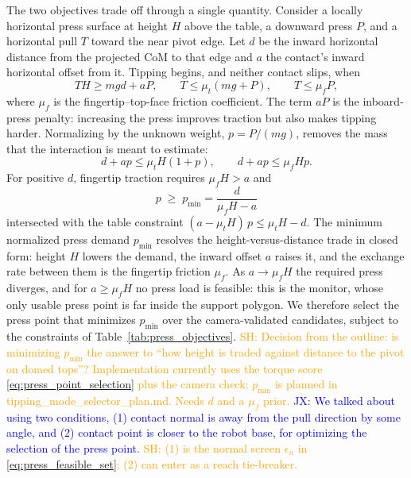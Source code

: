 \documentclass[10pt, conference]{IEEEtran}
\newcommand{\jx}[1]{\textcolor{blue}{JX: #1}}
\newcommand{\sh}[1]{\textcolor{orange}{SH: #1}}
\begin{document}
The two objectives trade off through a single quantity. Consider a locally horizontal press surface at height $H$ above the table, a downward press $P$, and a horizontal pull $T$ toward the near pivot edge. Let $d$ be the inward horizontal distance from the projected CoM to that edge and $a$ the contact's inward horizontal offset from it. Tipping begins, and neither contact slips, when
\begin{equation}
    TH \ge mgd + aP, \qquad T \le \mu_t(mg + P), \qquad T \le \mu_f P,
    \label{eq:pp_onset}
\end{equation}
where $\mu_f$ is the fingertip--top-face friction coefficient. The term $aP$ is the inboard-press penalty: increasing the press improves traction but also makes tipping harder. Normalizing by the unknown weight, $p = P/(mg)$, removes the mass that the interaction is meant to estimate:
\begin{equation}
    d + ap \le \mu_t H (1+p), \qquad d + ap \le \mu_f H p.
    \label{eq:pp_normalized}
\end{equation}
For positive $d$, fingertip traction requires $\mu_f H > a$ and
\begin{equation}
    \boxed{\, p \;\ge\; p_{\min} = \frac{d}{\mu_f H - a} \,}
    \label{eq:press_demand}
\end{equation}
intersected with the table constraint $(a - \mu_t H)\,p \le \mu_t H - d$. The minimum normalized press demand $p_{\min}$ resolves the height-versus-distance trade in closed form: height $H$ lowers the demand, the inward offset $a$ raises it, and the exchange rate between them is the fingertip friction $\mu_f$. As $a \to \mu_f H$ the required press diverges, and for $a \ge \mu_f H$ no press load is feasible: this is the monitor, whose only usable press point is far inside the support polygon. We therefore select the press point that minimizes $p_{\min}$ over the camera-validated candidates, subject to the constraints of Table~\ref{tab:press_objectives}. \sh{Decision from the outline: is minimizing $p_{\min}$ the answer to ``how height is traded against distance to the pivot on domed tops''? Implementation currently uses the torque score \eqref{eq:press_point_selection} plus the camera check; $p_{\min}$ is planned in tipping\_mode\_selector\_plan.md. Needs $d$ and a $\mu_f$ prior.} \jx{We talked about using two conditions, (1) contact normal is away from the pull direction by some angle, and (2) contact point is closer to the robot base, for optimizing the selection of the press point.} \sh{(1) is the normal screen $\epsilon_n$ in \eqref{eq:press_feasible_set}; (2) can enter as a reach tie-breaker.}
\end{document}
